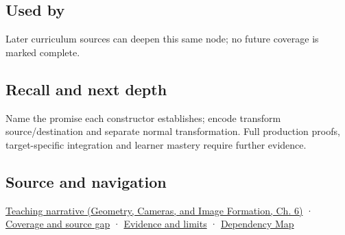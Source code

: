 \subsection{Used by}\label{appendix-380a220e2529-used-by}

\hypertarget{appendix-380a220e2529-used-by}{}

Later curriculum sources can deepen this same node; no future coverage is marked complete.

\subsection{Recall and next depth}\label{appendix-380a220e2529-recall-and-next-depth}

\hypertarget{appendix-380a220e2529-recall-and-next-depth}{}

Name the promise each constructor establishes; encode transform source/destination and separate normal transformation. Full production proofs, target-specific integration and learner mastery require further evidence.

\subsection{Source and navigation}\label{appendix-380a220e2529-source-and-navigation}

\hypertarget{appendix-380a220e2529-source-and-navigation}{}

\href{../03-Geometry-Cameras-and-Image-Formation/main.pdf\#nameddest=02-foundations-ii-ch037-types-can-remember-the-promises-that-three-components-forget}{Teaching narrative (Geometry, Cameras, and Image Formation, Ch. 6)} · \hyperref[appendix-fd090d982a15-phase-6---parts-501-600]{Coverage and source gap} · \hyperref[appendix-a103e7846d21-phase-6---source-analysis-and-verification]{Evidence and limits} · \hyperref[appendix-4ad47bdd269a]{Dependency Map}
